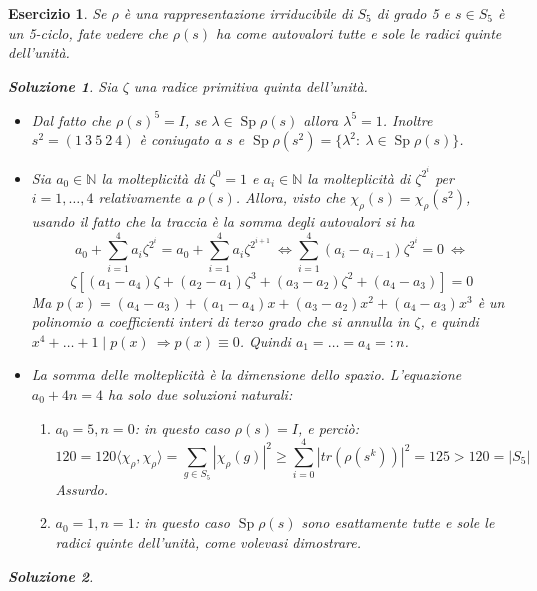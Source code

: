 \documentclass[a4paper]{article}
\theoremstyle{break}
\newtheorem{ex}{{ \Large Esercizio} }
\theoremstyle{plain}
\newtheorem{sol}{Soluzione}[ex]
\DeclareMathOperator{\Sp}{Sp}
\begin{document}
\begin{ex}
Se $\rho$ è una rappresentazione irriducibile di $S_5$ di grado 5 e $s \in S_5$ è un 5-ciclo, fate vedere che $\rho(s)$ ha come autovalori tutte e sole le radici quinte dell’unità.

\begin{sol}
Sia $\zeta$ una radice primitiva quinta dell'unità.
\begin{itemize}
\item Dal fatto che $\rho(s)^5 = I$, se $\lambda \in \Sp \rho(s)$ allora $\lambda^5=1$. \newline
Inoltre $s^2=(1\ 3 \ 5 \ 2\ 4)$ è coniugato a $s$ e $\Sp \rho(s^2) = \{\lambda^2:\ \lambda \in \Sp \rho(s) \}$.
\item Sia $a_0 \in \mathbb{N} $ la molteplicità di $\zeta^0 = 1$ e $a_i \in \mathbb{N}$ la molteplicità di $\zeta^{2^i}$ per $i=1, \ldots,4$ relativamente a $\rho(s)$. Allora, visto che $\chi_{\rho}(s) = \chi_{\rho}(s^2)$, usando il fatto che la traccia è la somma degli autovalori si ha
$$ a_0 + \sum_{i=1}^4 a_i \zeta^{2^i} = a_0 + \sum_{i=1}^4 a_i \zeta^{2^{i+1}}\  \Leftrightarrow \sum_{i=1}^4 (a_i - a_{i-1})\zeta^{2^i} = 0 \ \Leftrightarrow $$
$$ \zeta [ (a_1-a_4)\zeta + (a_2-a_1)\zeta^3 + (a_3 - a_2) \zeta^2 + (a_4 - a_3) ] = 0 $$
Ma $p(x) = (a_4-a_3) + (a_1-a_4)x + (a_3-a_2)x^2 + (a_4-a_3)x^3 $ è un polinomio a coefficienti interi di terzo grado che si annulla in $\zeta$, e quindi \newline
$x^4+ \ldots + 1 \mid p(x) \ \Rightarrow p(x) \equiv 0$. \newline
Quindi $a_1 = \ldots = a_4 =:n$.
\item La somma delle molteplicità è la dimensione dello spazio. L'equazione $a_0+4n=4$ ha solo due soluzioni naturali:
\begin{enumerate}
\item $a_0=5, n=0$: in questo caso $\rho(s)=I$, e perciò: 
$$ 120 = 120 \langle \chi_{\rho}, \chi_{\rho} \rangle = \sum_{g \in S_5} | \chi_{\rho}(g) |^2 \ge \sum_{i=0}^{4} |tr(\rho(s^k))|^2 = 125 > 120 = |S_5| $$
Assurdo.
\item $a_0 = 1, n=1$: in questo caso $\Sp \rho(s)$ sono esattamente tutte e sole le radici quinte dell'unità, come volevasi dimostrare.
\end{enumerate}
\end{itemize}
\end{sol}

\begin{sol}

\end{sol}


\end{ex}
\end{document}
